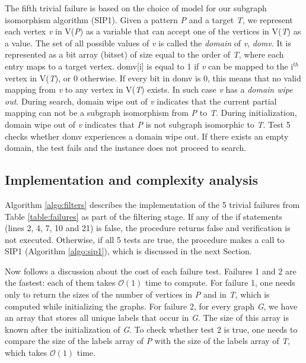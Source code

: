 \documentclass{l4proj}
\begin{document}
The fifth trivial failure is based on the choice of model for our subgraph isomorphism algorithm (SIP1). Given a pattern \emph{P} and a target \emph{T}, we represent each vertex \emph{v} in V(\emph{P}) as a variable that can accept one of the vertices in V(\emph{T}) as a value. The set of all possible values of \emph{v} is called the \emph{domain} of \emph{v}, \emph{domv}. It is represented as a bit array (bitset) of size equal to the order of \emph{T}, where each entry maps to a target vertex. domv[i] is equal to 1 if \emph{v} can be mapped to the i$^{th}$ vertex in V(\emph{T}), or 0 otherwise. If every bit in domv is 0, this means that no valid mapping from \emph{v} to any vertex in V(\emph{T}) exists. In such case \emph{v} has a \emph{domain wipe out}. During search, domain wipe out of \emph{v} indicates that the current partial mapping can not be a subgraph isomorphism from \emph{P} to \emph{T}. During initialization, domain wipe out of \emph{v} indicates that \emph{P} is not subgraph isomorphic to \emph{T}. Test 5 checks whether domv experiences a domain wipe out. If there exists an empty domain, the test fails and the instance does not proceed to search.

\subsection{Implementation and complexity analysis}
\label{sec:trivialFailsImplementation}
Algorithm \ref{algo:filters} describes the implementation of the 5 trivial failures from Table \ref{table:failures} as part of the filtering stage. If any of the if statements (lines 2, 4, 7, 10 and 21) is false, the procedure returns false and verification is not executed. Otherwise, if all 5 tests are true, the procedure makes a call to SIP1 (Algorithm \ref{algo:sip1}), which is discussed in the next Section.

Now follows a discussion about the cost of each failure test.
Failures 1 and 2 are the fastest: each of them takes $\mathcal{O}(1)$ time to compute. For failure 1, one needs only to return the sizes of the number of vertices in \emph{P} and in \emph{T}, which is computed while initializing the graphs. For failure 2, for every graph \emph{G}, we have an array that stores all unique labels that occur in \emph{G}. The size of this array is known after the initialization of \emph{G}. To check whether test 2 is true, one needs to compare the size of the labels array of \emph{P} with the size of the labels array of \emph{T},  which takes $\mathcal{O}(1)$ time.
\end{document}
